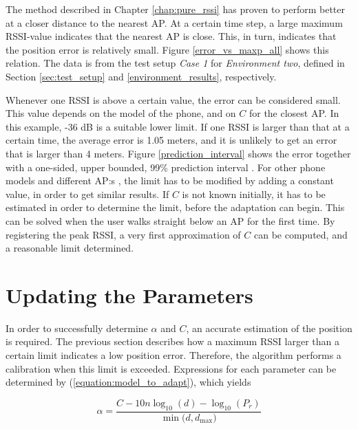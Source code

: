 \documentclass{LTHthesis}
\begin{document}
The method described in Chapter \ref{chap:pure_rssi} has proven to perform better at a closer distance to the nearest AP. At a certain time step, a large maximum RSSI-value indicates that the nearest AP is close. This, in turn, indicates that the position error is relatively small. Figure \ref{error_vs_maxp_all} shows this relation. The data is from the test setup \emph{Case 1} for \emph{Environment two}, defined in Section \ref{sec:test_setup} and \ref{environment_results}, respectively.

Whenever one RSSI is above a certain value, the error can be considered small. This value depends on the model of the phone, and on $C$ for the closest AP. In this example, -36 dB is a suitable lower limit. If one RSSI is larger than that at a certain time, the average error is 1.05 meters, and it is unlikely to get an error that is larger than 4 meters. Figure \ref{prediction_interval} shows the error together with a one-sided, upper bounded, 99\% prediction interval \cite{matstat}. For other phone models and different AP:s , the limit has to be modified by adding a constant value, in order to get similar results. If $C$ is not known initially, it has to be estimated in order to determine the limit, before the adaptation can begin.  This can be solved when the user walks straight below an AP for the first time. By registering the peak RSSI, a very first approximation of $C$ can be computed, and a reasonable limit determined.

%
\section{Updating the Parameters} %
%
In order to successfully determine $\alpha$ and $C$, an accurate estimation of the position is required. The previous section describes how a maximum RSSI larger than a certain limit indicates a low position error. Therefore, the algorithm performs a calibration when this limit is exceeded. Expressions for each parameter can be determined by (\ref{equation:model_to_adapt}), which yields

%
\begin{equation}
\alpha=\frac{C-10n\log_{10}(d)-\log_{10}(P_r)}{\min({d, d_{\text{max}})}}
\label{equation:update_alpha}
\end{equation}
%
\end{document}
